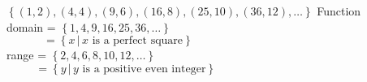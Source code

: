{ $\left\{ (1,2), (4,4), (9,6), (16,8), (25,10), (36, 12), \ldots \right\}$}
{Function \\ domain =   $\left\{ 1, 4, 9, 16, 25, 36, \ldots \right\}$\\
$\phantom{\text{domain}} = \left\{ x \, | \, \text{$x$ is a perfect square} \right\}$ \\ range =  $\left\{ 2, 4, 6, 8, 10, 12, \ldots \right\}$\\
$\phantom{range} = \left\{ y \, | \, \text{$y$ is a positive even integer} \right\}$}